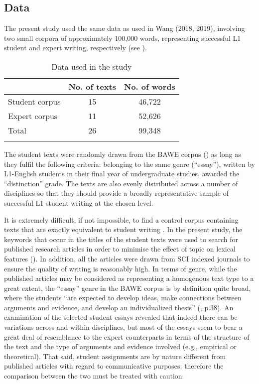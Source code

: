\documentclass[output=paper]{langscibook}
\begin{document}
\subsection{Data}

The present study used the same data as used in Wang (2018, 2019), involving two small corpora of approximately 100,000 words, representing successful L1 student and expert writing, respectively (see ). 


\begin{table}
\begin{tabular}{lcc} 
\lsptoprule
& No. of texts & No. of words\\\midrule
Student corpus & 15 & 46,722\\
Expert corpus  & 11 & 52,626\\
Total          & 26 & 99,348\\
\lspbottomrule
\end{tabular}
\caption{Data used in the study\label{tab:wang:1}}
\end{table}

The student texts were randomly drawn from the BAWE corpus (\citealt{NesiGardner2012}) as long as they fulfil the following criteria: belonging to the same genre (``essay''), written by L1-English students in their final year of undergraduate studies, awarded the ``distinction'' grade. The texts are also evenly distributed across a number of disciplines so that they should provide a broadly representative sample of successful L1 student writing at the chosen level. 

It is extremely difficult, if not impossible, to find a control corpus containing texts that are exactly equivalent to student writing \citep{Callies2015}. In the present study, the keywords that occur in the titles of the student texts were used to search for published research articles in order to minimise the effect of topic on lexical features (\citealt{CainesButtery2017}). In addition, all the articles were drawn from SCI indexed journals to ensure the quality of writing is reasonably high. In terms of genre, while the published articles may be considered as representing a homogenous text type to a great extent, the ``essay'' genre in the BAWE corpus is by definition quite broad, where the students “are expected to develop ideas, make connections between arguments and evidence, and develop an individualized thesis” (\citealt{NesiGardner2012}, p.38). An examination of the selected student essays revealed that indeed there can be variations across and within disciplines, but most of the essays seem to bear a great deal of resemblance to the expert counterparts in terms of the structure of the text and the type of arguments and evidence involved (e.g., empirical or theoretical). That said, student assignments are by nature different from published articles with regard to communicative purposes; therefore the comparison between the two must be treated with caution. 
\end{document}
